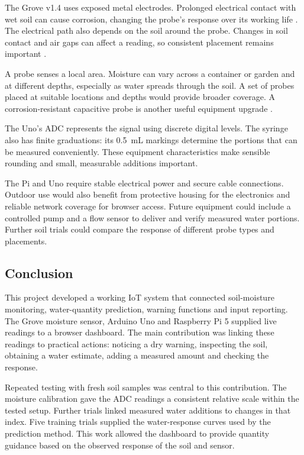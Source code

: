\documentclass[11pt,a4paper]{article}
\begin{document}
The Grove v1.4 uses exposed metal electrodes. Prolonged electrical contact with wet soil can cause corrosion, changing the probe's response over its working life \cite{ref2}. The electrical path also depends on the soil around the probe. Changes in soil contact and air gaps can affect a reading, so consistent placement remains important \cite{ref4}.

A probe senses a local area. Moisture can vary across a container or garden and at different depths, especially as water spreads through the soil. A set of probes placed at suitable locations and depths would provide broader coverage. A corrosion-resistant capacitive probe is another useful equipment upgrade \cite{refSensorLimits}.

The Uno's ADC represents the signal using discrete digital levels. The syringe also has finite graduations: its 0.5~mL markings determine the portions that can be measured conveniently. These equipment characteristics make sensible rounding and small, measurable additions important.

The Pi and Uno require stable electrical power and secure cable connections. Outdoor use would also benefit from protective housing for the electronics and reliable network coverage for browser access. Future equipment could include a controlled pump and a flow sensor to deliver and verify measured water portions. Further soil trials could compare the response of different probe types and placements.

\subsection{Conclusion}

This project developed a working IoT system that connected soil-moisture monitoring, water-quantity prediction, warning functions and input reporting. The Grove moisture sensor, Arduino Uno and Raspberry Pi 5 supplied live readings to a browser dashboard. The main contribution was linking these readings to practical actions: noticing a dry warning, inspecting the soil, obtaining a water estimate, adding a measured amount and checking the response.

Repeated testing with fresh soil samples was central to this contribution. The moisture calibration gave the ADC readings a consistent relative scale within the tested setup. Further trials linked measured water additions to changes in that index. Five training trials supplied the water-response curves used by the prediction method. This work allowed
the dashboard to provide quantity guidance based on the observed response of the soil and sensor.
\end{document}
